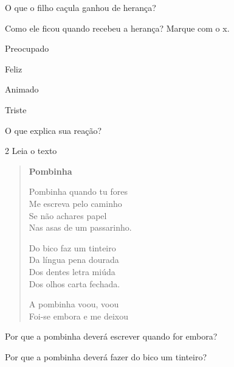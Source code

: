\begin{escolha}
\item O que o filho caçula ganhou de herança?


\item Como ele ficou quando recebeu a herança? Marque com o x.

\begin{boxlist}
 Preocupado

 Feliz

 Animado

 Triste
\end{boxlist}

\item O que explica sua reação?

\end{escolha}

\num{2} Leia o texto

\begin{verse}
\textbf{Pombinha}

Pombinha quando tu fores\\
Me escreva pelo caminho\\
Se não achares papel\\
Nas asas de um passarinho.

Do bico faz um tinteiro\\
Da língua pena dourada\\
Dos dentes letra miúda\\
Dos olhos carta fechada.

A pombinha voou, voou\\
Foi-se embora e me deixou
\end{verse}


\begin{escolha}
\item Por que a pombinha deverá escrever quando for embora?


\item Por que a pombinha deverá fazer do bico um tinteiro?

\end{escolha}

